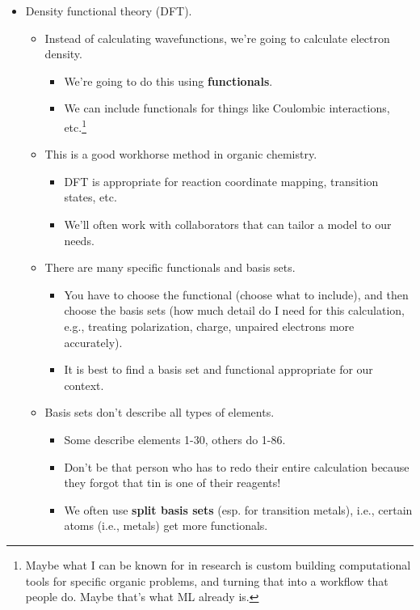 \documentclass[../notes.tex]{subfiles}
\begin{document}
\begin{itemize}
    \item Density functional theory (DFT).
    \begin{itemize}
        \item Instead of calculating wavefunctions, we're going to calculate electron density.
        \begin{itemize}
            \item We're going to do this using \textbf{functionals}.
            \item We can include functionals for things like Coulombic interactions, etc.\footnote{Maybe what I can be known for in research is custom building computational tools for specific organic problems, and turning that into a workflow that people do. Maybe that's what ML already is.}
        \end{itemize}
        \item This is a good workhorse method in organic chemistry.
        \begin{itemize}
            \item DFT is appropriate for reaction coordinate mapping, transition states, etc.
            \item We'll often work with collaborators that can tailor a model to our needs.
        \end{itemize}
        \item There are many specific functionals and basis sets.
        \begin{itemize}
            \item You have to choose the functional (choose what to include), and then choose the basis sets (how much detail do I need for this calculation, e.g., treating polarization, charge, unpaired electrons more accurately).
            \item It is best to find a basis set and functional appropriate for our context.
        \end{itemize}
        \item Basis sets don't describe all types of elements.
        \begin{itemize}
            \item Some describe elements 1-30, others do 1-86.
            \item Don't be that person who has to redo their entire calculation because they forgot that tin is one of their reagents!
            \item We often use \textbf{split basis sets} (esp. for transition metals), i.e., certain atoms (i.e., metals) get more functionals.

\end{itemize}
\end{itemize}
\end{itemize}
\end{document}
